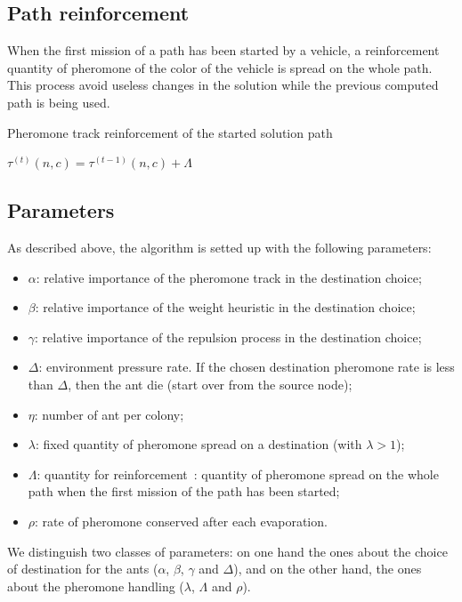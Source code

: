\documentclass[a4paper,12pt]{article}
\begin{document}
\subsection{Path reinforcement}
When the first mission of a path has been started by a vehicle, a reinforcement quantity of pheromone of the color of the vehicle is spread on the whole path. This process avoid useless changes in the solution while the previous computed path is being used.


\begin{algorithm}
\caption{Pheromone track reinforcement of the started solution path}
\begin{algorithmic} 
\label{algoReinforcement}
\STATE $\tau^{(t)}(n,c) =  \tau^{(t-1)}(n,c) + \Lambda$
\ENDFOR
\end{algorithmic}
\end{algorithm}

\subsection{Parameters}
As described above, the algorithm is setted up with the following parameters:

\begin{itemize}
 \item $\alpha$: relative importance of the pheromone track in the destination choice;
 \item $\beta$:  relative importance of the weight heuristic in the destination choice;
 \item $\gamma$: relative importance of the repulsion process in the destination choice;
 \item $\Delta$: environment pressure rate. If the chosen destination pheromone rate is less than $\Delta$, then the ant die (start over from the source node);
 \item $\eta$: number of ant per colony;
 \item $\lambda$: fixed quantity of pheromone spread on a destination (with $\lambda > 1$);
 \item $\Lambda$: quantity for reinforcement : quantity of pheromone spread on the whole path when the first mission of the path has been started;
 \item $\rho$: rate of pheromone conserved after each evaporation.
\end{itemize}

We distinguish two classes of parameters: on one hand the ones about the choice of destination for the ants ($\alpha$, $\beta$, $\gamma$ and $\Delta$), and on the other hand, the ones about the pheromone handling ($\lambda$, $\Lambda$ and $\rho$).\\
\end{document}
